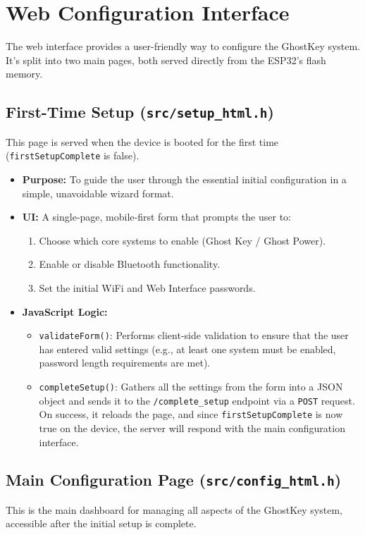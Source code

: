 \documentclass{article}
\begin{document}
\section{Web Configuration Interface}
The web interface provides a user-friendly way to configure the GhostKey system. It's split into two main pages, both served directly from the ESP32's flash memory.

\subsection{First-Time Setup (\texttt{src/setup\_html.h})}
This page is served when the device is booted for the first time (\texttt{firstSetupComplete} is false).
\begin{itemize}
    \item \textbf{Purpose:} To guide the user through the essential initial configuration in a simple, unavoidable wizard format.
    \item \textbf{UI:} A single-page, mobile-first form that prompts the user to:
    \begin{enumerate}
        \item Choose which core systems to enable (Ghost Key / Ghost Power).
        \item Enable or disable Bluetooth functionality.
        \item Set the initial WiFi and Web Interface passwords.
    \end{enumerate}
    \item \textbf{JavaScript Logic:}
    \begin{itemize}
        \item \texttt{validateForm()}: Performs client-side validation to ensure that the user has entered valid settings (e.g., at least one system must be enabled, password length requirements are met).
        \item \texttt{completeSetup()}: Gathers all the settings from the form into a JSON object and sends it to the \texttt{/complete\_setup} endpoint via a \texttt{POST} request. On success, it reloads the page, and since \texttt{firstSetupComplete} is now true on the device, the server will respond with the main configuration interface.
    \end{itemize}
\end{itemize}

\subsection{Main Configuration Page (\texttt{src/config\_html.h})}
This is the main dashboard for managing all aspects of the GhostKey system, accessible after the initial setup is complete.
\end{document}

